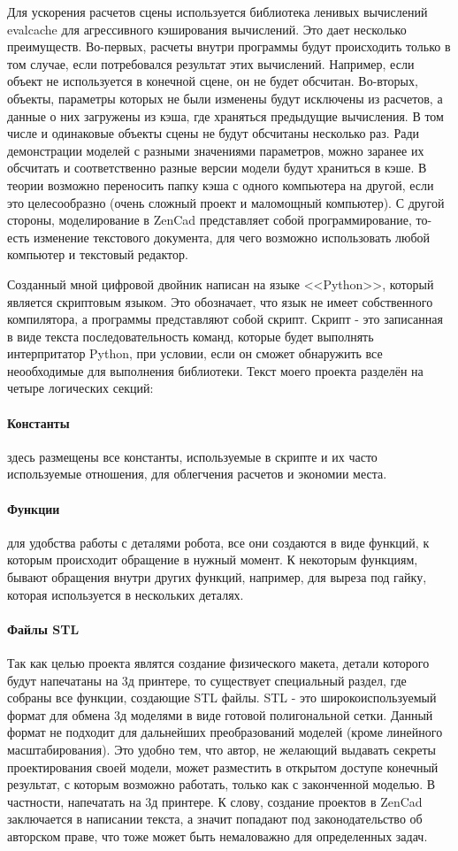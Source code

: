 Для ускорения расчетов сцены используется библиотека ленивых вычислений evalcache для агрессивного кэширования вычислений. Это дает несколько преимуществ. Во-первых, расчеты внутри программы будут происходить только в том случае, если потребовался результат этих вычислений. Например, если объект не используется в конечной сцене, он не будет обсчитан. Во-вторых, объекты, параметры которых не были изменены будут исключены из расчетов, а данные о них загружены из кэша, где храняться предыдущие вычисления. В том числе и одинаковые объекты сцены не будут обсчитаны несколько раз. Ради демонстрации моделей с разными значениями параметров, можно заранее их обсчитать и соответственно разные версии модели будут храниться в кэше. В теории возможно переносить папку кэша с одного компьютера на другой, если это целесообразно (очень сложный проект и маломощный компьютер). С другой стороны, моделирование в ZenCad представляет собой программирование, то-есть изменение текстового документа, для чего возможно использовать любой компьютер и текстовый редактор.

Созданный мной цифровой двойник написан на языке <<Python>>, который является скриптовым языком. Это обозначает, что язык не имеет собственного компилятора, а программы представляют собой скрипт. Скрипт - это записанная в виде текста последовательность команд, которые будет выполнять интерпритатор Python, при условии, если он сможет обнаружить все неообходимые для выполнения библиотеки. Текст моего проекта разделён на четыре логических секций:

\paragraph{Константы} здесь размещены все константы, используемые в скрипте и их часто используемые отношения, для облегчения расчетов и экономии места.
\paragraph{Функции} для удобства работы с деталями робота, все они создаются в виде функций, к которым происходит обращение в нужный момент. К некоторым функциям, бывают обращения внутри других функций, например, для выреза под гайку, которая используется в нескольких деталях.  
\paragraph{Файлы STL} Так как целью проекта являтся создание физического макета, детали которого будут напечатаны на 3д принтере, то существует специальный раздел, где собраны все функции, создающие STL файлы. STL - это широкоиспользуемый формат для обмена 3д моделями в виде готовой полигональной сетки. Данный формат не подходит для дальнейших преобразований моделей (кроме линейного масштабирования). Это удобно тем, что автор, не желающий выдавать секреты проектирования своей модели, может разместить в открытом доступе конечный результат, с которым возможно работать, только  как с законченной моделью. В частности, напечатать на 3д принтере. К слову, создание проектов в ZenCad заключается в написании текста, а значит попадают под законодательство об авторском праве, что тоже может быть немаловажно для определенных задач.
